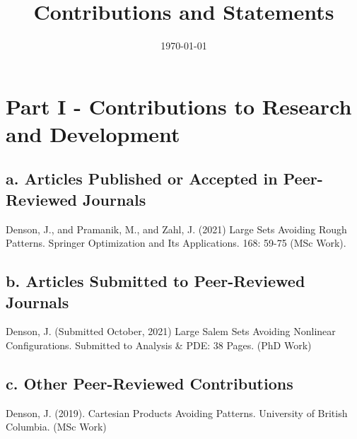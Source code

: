 \documentclass[12pt]{article}
\title{Contributions and Statements}
\author{}
\date{\today}
\theoremstyle{plain}
\theoremstyle{remark}
\theoremstyle{definition}
\begin{document}
\maketitle

\section*{Part I - Contributions to Research and Development}

\subsection*{a. Articles Published or Accepted in Peer-Reviewed Journals}

\begin{thebibliography}{9}

Denson, J., and Pramanik, M., and Zahl, J. (2021) Large Sets Avoiding Rough Patterns. Springer Optimization and Its Applications. 168: 59-75 (MSc Work).

\end{thebibliography}


\subsection*{b. Articles Submitted to Peer-Reviewed Journals}

\begin{thebibliography}{9}

\makeatletter
\addtocounter{\@listctr}{1}
\makeatother

Denson, J. (Submitted October, 2021) Large Salem Sets Avoiding Nonlinear Configurations. Submitted to Analysis \& PDE: 38 Pages. (PhD Work)

\end{thebibliography}


\subsection*{c. Other Peer-Reviewed Contributions}

\begin{thebibliography}{9}

\makeatletter
\addtocounter{\@listctr}{2}
\makeatother

Denson, J. (2019). Cartesian Products Avoiding Patterns. University of British Columbia. (MSc Work)

\end{thebibliography}
\end{document}
